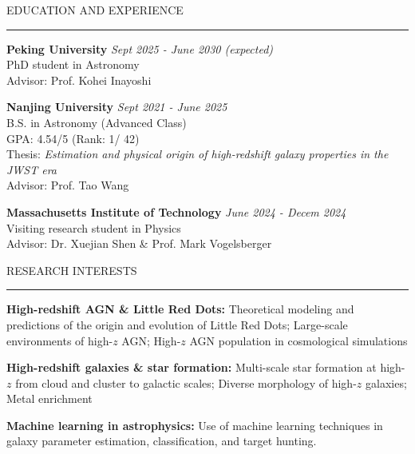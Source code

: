 \documentclass{resume} %
\renewenvironment{rSection}[1]{
\sectionskip
\textcolor{CarnegieMellonRed}{\MakeUppercase{#1}}
\sectionlineskip
\hrule
\begin{list}{}{
\setlength{\leftmargin}{1.5em}
}
\item[]
}{
\end{list}
}
\begin{document}
\begin{rSection}{Education and Experience}
{\bf Peking University} \hfill {\em Sept 2025 - June 2030 (expected)}
\\ PhD student in Astronomy \hfill
\\  Advisor: Prof. Kohei Inayoshi \hfill

{\bf Nanjing University} \hfill {\em Sept 2021 - June 2025}
\\ B.S. in Astronomy (Advanced Class)
\\ \qquad GPA: 4.54/5 (Rank: 1/ 42)\qquad  \hfill
\\ \qquad Thesis: \textit{Estimation and physical origin of high-redshift galaxy properties in the JWST era}
\\  Advisor: Prof. Tao Wang \hfill

{\bf Massachusetts Institute of Technology} \hfill {\em June 2024 - Decem 2024}
\\ Visiting research student in Physics
\\  Advisor: Dr. Xuejian Shen \& Prof. Mark Vogelsberger\hfill
\end{rSection}

\begin{rSection}{Research Interests}
{\bf High-redshift AGN \& Little Red Dots:} Theoretical modeling and predictions of the origin and evolution of Little Red Dots; Large-scale environments of high-$z$ AGN; High-$z$ AGN population in cosmological simulations \hfill

{\bf High-redshift galaxies \& star formation:} Multi-scale star formation at high-$z$ from cloud and cluster to galactic scales; Diverse morphology of high-$z$ galaxies; Metal enrichment \hfill

{\bf Machine learning in astrophysics:} Use of machine learning techniques in galaxy parameter estimation, classification, and target hunting. \hfill


\end{rSection}


\end{document}
